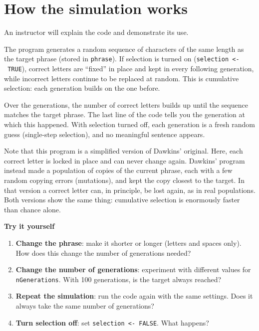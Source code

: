 \documentclass[
  a4paper]{book}
\providecommand{\tightlist}{%
  \setlength{\itemsep}{0pt}\setlength{\parskip}{0pt}}
\begin{document}
\section{How the simulation works}\label{how-the-simulation-works}

An instructor will explain the code and demonstrate its use.

The program generates a random sequence of characters of the same length as the target phrase (stored in \texttt{phrase}). If selection is turned on (\texttt{selection\ \textless{}-\ TRUE}), correct letters are ``fixed'' in place and kept in every following generation, while incorrect letters continue to be replaced at random. This is cumulative selection: each generation builds on the one before.

Over the generations, the number of correct letters builds up until the sequence matches the target phrase. The last line of the code tells you the generation at which this happened. With selection turned off, each generation is a fresh random guess (single-step selection), and no meaningful sentence appears.

Note that this program is a simplified version of Dawkins' original. Here, each correct letter is locked in place and can never change again. Dawkins' program instead made a population of copies of the current phrase, each with a few random copying errors (mutations), and kept the copy closest to the target. In that version a correct letter can, in principle, be lost again, as in real populations. Both versions show the same thing: cumulative selection is enormously faster than chance alone.

\textbf{Try it yourself}

\begin{enumerate}
\def\labelenumi{\arabic{enumi})}
\tightlist
\item
  \textbf{Change the phrase}: make it shorter or longer (letters and spaces only). How does this change the number of generations needed?
\item
  \textbf{Change the number of generations}: experiment with different values for \texttt{nGenerations}. With 100 generations, is the target always reached?
\item
  \textbf{Repeat the simulation}: run the code again with the same settings. Does it always take the same number of generations?
\item
  \textbf{Turn selection off}: set \texttt{selection\ \textless{}-\ FALSE}. What happens?
\end{enumerate}
\end{document}
